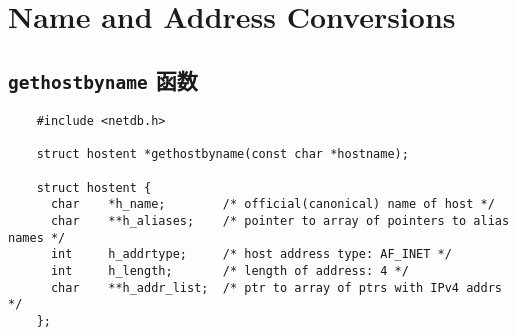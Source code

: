 \section{Name and Address Conversions}

  \subsection{\texttt{gethostbyname} 函数}

    \begin{verbatim}
    #include <netdb.h>

    struct hostent *gethostbyname(const char *hostname);
    
    struct hostent {
      char    *h_name;        /* official(canonical) name of host */
      char    **h_aliases;    /* pointer to array of pointers to alias names */
      int     h_addrtype;     /* host address type: AF_INET */
      int     h_length;       /* length of address: 4 */
      char    **h_addr_list;  /* ptr to array of ptrs with IPv4 addrs */
    };
    \end{verbatim}